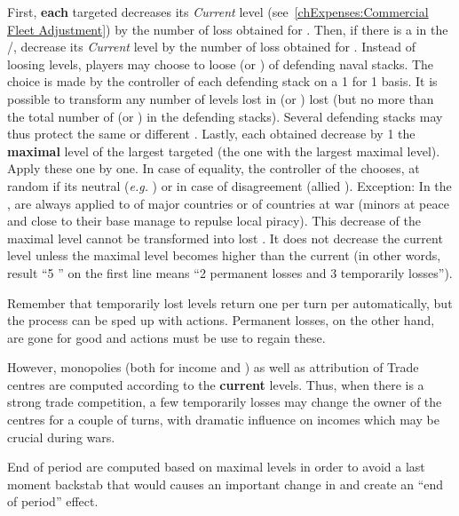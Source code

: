 \bparag First, \textbf{each} targeted \TradeFLEET\facemoins decreases its
\emph{Current} level (see~\ref{chExpenses:Commercial Fleet Adjustment}) by the
number of loss obtained for \TradeFLEET\facemoins.
\bparag Then, if there is a \TradeFLEET\faceplus in the \STZ/\CTZ, decrease
its \emph{Current} level by the number of loss obtained for
\TradeFLEET\faceplus.
\bparag Instead of loosing \TradeFLEET levels, players may choose to loose \ND
(or \NGD) of defending naval stacks. The choice is made by the controller of
each defending stack on a 1 for 1 basis. It is possible to transform any
number of levels lost in \ND (or \NGD) lost (but no more than the total number
of \ND (or \NGD) in the defending stacks). Several defending stacks may thus
protect the same or different \TradeFLEET.
\bparag Lastly, each \textetoile obtained decrease by 1 the \textbf{maximal}
level of the largest targeted \TradeFLEET (the one with the largest maximal
level). Apply these \textetoile one by one. In case of equality, the
controller of the \corsaire chooses, at random if its neutral (\emph{e.g.}
) or in case of disagreement (allied \corsaire).
\bparag Exception: In the \ROTW, \textetoile are always applied to \TradeFLEET
of major countries or of countries at war (minors at peace and close to their
base manage to repulse local piracy).
\bparag This decrease of the maximal level cannot be transformed into lost
\ND. It does not decrease the current level unless the maximal level becomes
higher than the current (in other words, result ``5 \textetoile\textetoile''
on the first line means ``2 permanent losses and 3 temporarily losses'').

\begin{playtip}
  Remember that temporarily lost levels return one per turn per \TradeFLEET
  automatically, but the process can be sped up with \TFI actions. Permanent
  losses, on the other hand, are gone for good and \TFI actions must be use to
  regain these.

  However, monopolies (both for income and \VPs) as well as attribution of
  Trade centres are computed according to the \textbf{current} levels. Thus,
  when there is a strong trade competition, a few temporarily losses may
  change the owner of the centres for a couple of turns, with dramatic
  influence on incomes which may be crucial during wars.

  End of period \VPs are computed based on maximal levels in order to avoid a
  last moment backstab that would causes an important change in \VPs and
  create an ``end of period'' effect.
\end{playtip}

